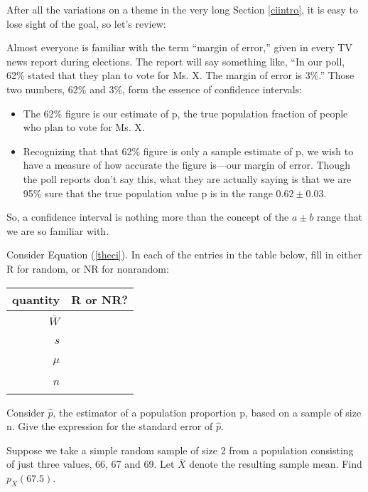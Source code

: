 After all the variations on a theme in the very long Section
\ref{ciintro}, it is easy to lose sight of the goal, so let's review:

Almost everyone is familiar with the term ``margin of error,'' given in
every TV news report during elections.  The report will say something
like, ``In our poll, 62\% stated that they plan to vote for Ms. X.  The
margin of error is 3\%.''  Those two numbers, 62\% and 3\%, form the
essence of confidence intervals:

\begin{itemize}

\item The 62\% figure is our estimate of p, the true population fraction
of people who plan to vote for Ms. X.

\item Recognizing that that 62\% figure is only a sample estimate of p,
we wish to have a measure of how accurate the figure is---our margin of
error.  Though the poll reports don't say this, what they are actually
saying is that we are 95\% sure that the true population value p is in
the range $0.62 \pm 0.03$.

\end{itemize}

So, a confidence interval is nothing more than the concept of the
$a \pm b$ range that we are so familiar with.

\startproblemset

\oneproblem
Consider Equation (\ref{theci}).  In each of the entries in
the table below, fill in either R for random, or NR for nonrandom:

\begin{tabular}{|r|r|}
\hline
quantity & R or NR? \\ \hline
$\overline{W}$ & \ \\ \hline
$s$ & \ \\ \hline
$\mu$ & \ \\ \hline
$n$ & \ \\ \hline
\end{tabular}

\oneproblem
Consider $\hat{p}$, the estimator of a population
proportion p, based on a sample of size n.  Give the expression for the
standard error of $\hat{p}$.

\oneproblem
Suppose we take a simple random sample of size 2 from a
population consisting of just three values, 66, 67 and 69.  Let
$\overline{X}$ denote the resulting sample mean.  Find
$p_{\overline{X}}(67.5)$.

